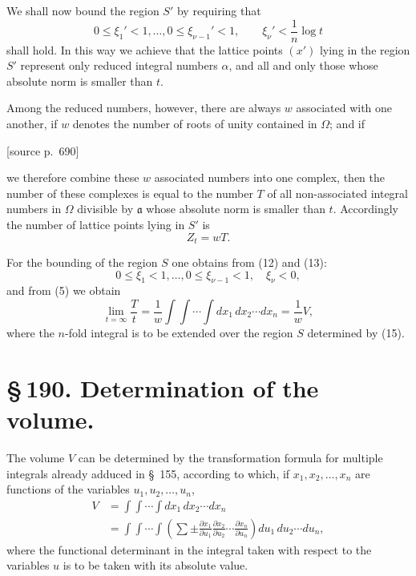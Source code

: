 \documentclass[11pt]{article}
\newcommand{\srcpage}[1]{\par\medskip\noindent\textsf{[source p.~#1]}\par\smallskip}
\begin{document}
We shall now bound the region $S'$ by requiring that
\begin{equation}
0\leq\xi_1'<1,\ldots,
0\leq\xi_{\nu-1}'<1,
\qquad
\xi_\nu'<\frac1n\log t
\tag{13}
\end{equation}
shall hold. In this way we achieve that the lattice points $(x')$ lying in the region $S'$ represent only reduced integral numbers $\alpha$, and all and only those whose absolute norm is smaller than $t$.

Among the reduced numbers, however, there are always $w$ associated with one another, if $w$ denotes the number of roots of unity contained in $\Omega$; and if

\srcpage{690}
we therefore combine these $w$ associated numbers into one complex, then the number of these complexes is equal to the number $T$ of all non-associated integral numbers in $\Omega$ divisible by $\mathfrak a$ whose absolute norm is smaller than $t$. Accordingly the number of lattice points lying in $S'$ is
\begin{equation}
Z_t=wT.
\tag{14}
\end{equation}

For the bounding of the region $S$ one obtains from (12) and (13):
\begin{equation}
0\leq\xi_1<1,\ldots,
0\leq\xi_{\nu-1}<1,
\quad \xi_\nu<0,
\tag{15}
\end{equation}
and from (5) we obtain
\begin{equation}
\lim_{t=\infty}\frac{T}{t}
=\frac1w\int\!\int\cdots\int dx_1\,dx_2\cdots dx_n
=\frac1w V,
\tag{16}
\end{equation}
where the $n$-fold integral is to be extended over the region $S$ determined by (15).

\section*{\S\,190. Determination of the volume.}

The volume $V$ can be determined by the transformation formula for multiple integrals already adduced in \S~155, according to which, if $x_1,x_2,\ldots,x_n$ are functions of the variables $u_1,u_2,\ldots,u_n$,
\begin{equation}
\begin{aligned}
V&=\int\!\int\cdots\int dx_1\,dx_2\cdots dx_n\\
&=\int\!\int\cdots\int\left(\sum\pm
\frac{\partial x_1}{\partial u_1}
\frac{\partial x_2}{\partial u_2}\cdots
\frac{\partial x_n}{\partial u_n}\right)du_1\,du_2\cdots du_n,
\end{aligned}
\tag{1}
\end{equation}
where the functional determinant in the integral taken with respect to the variables $u$ is to be taken with its absolute value.
\end{document}
